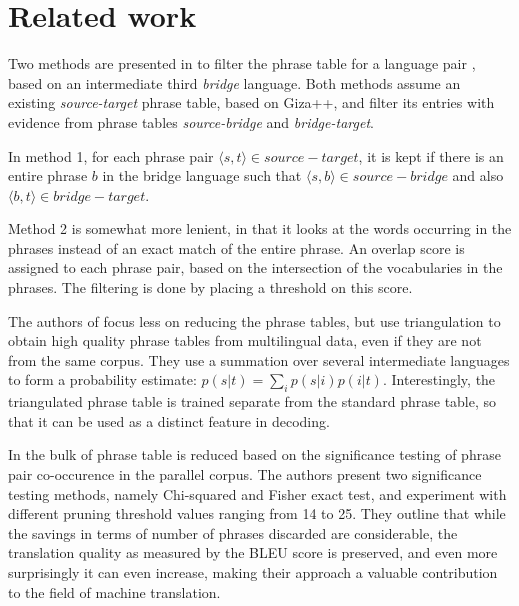 \documentclass[11pt]{article}
\begin{document}
\section{Related work}

Two methods are presented in \cite{chen} to filter the phrase table for a language pair%
, based on an intermediate third \emph{bridge} language. 
 Both methods assume an existing {\em source-target} phrase table, based on Giza++, and filter its entries with evidence from phrase tables {\em source-bridge} and {\em bridge-target}.

In method 1, for each phrase pair $\langle s, t\rangle \in source-target$, it is kept if there is an entire phrase $b$ in the bridge language such that $\langle s,b\rangle \in source-bridge$ and also $\langle b,t\rangle \in bridge-target$.

Method 2 is somewhat more lenient, in that it looks at the words occurring in the phrases instead of an exact match of the entire phrase. An overlap score is assigned to each phrase pair, based on the intersection of the vocabularies in the phrases. The filtering is done by placing a threshold on this score.

The authors of \cite{cohn} focus less on reducing the phrase tables, but use triangulation to obtain high quality phrase tables from multilingual data, even if they are not from the same corpus. They use a summation over several intermediate languages to form a probability estimate: $p(s|t)=\sum_i p(s|i)p(i|t)$. Interestingly, the triangulated phrase table is trained separate from the standard phrase table, so that it can be used as a distinct feature in decoding.

In \cite{Johnson} the bulk of phrase table is reduced based on the significance testing of phrase pair co-occurence in the parallel corpus. The authors present two significance testing methods, namely Chi-squared and Fisher exact test, and experiment with different pruning threshold values ranging from 14 to 25. They outline that while the savings in terms of number of phrases discarded are considerable, the translation quality as measured by the BLEU score is preserved, and even more surprisingly it can even increase, making their approach a valuable contribution to the field of machine translation.


\end{document}
